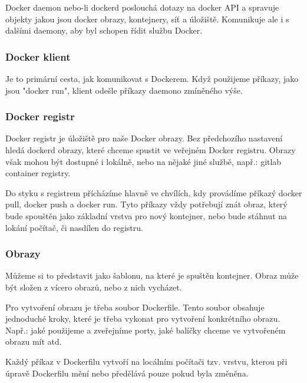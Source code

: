 Docker daemon nebo-li dockerd poslouchá dotazy na docker API a spravuje objekty jakou jsou docker obrazy, kontejnery, síť a úložiště. Komunikuje ale i s dalšími daemony, aby byl schopen řídit službu Docker.

\subsubsection{Docker klient}

Je to primární cesta, jak komunikovat s Dockerem. Když použijeme příkazy, jako jsou "docker run", klient odešle příkazy daemono zmíněného výše. 

\subsubsection{Docker registr}

Docker registr je úložiště pro naše Docker obrazy. Bez předchozího nastavení hledá dockerd obrazy, které chceme spustit ve veřejném Docker registru. Obrazy však mohou být dostupné i lokálně, nebo na nějaké jiné službě, např.: gitlab container registry. 

Do styku s registrem přícházíme hlavně ve chvílích, kdy provádíme příkazý docker pull, docker push a docker run. Tyto příkazy vždy potřebují znát obraz, který bude spouštěn jako základní vrstva pro nový kontejner, nebo bude stáhnut na lokání počítač, či nasdílen do registru.

\subsubsection{Obrazy}

Můžeme si to představit jako šablonu, na které je spuštěn kontejner. Obraz může být složen z vícero obrazů, nebo z nich vycházet. 

Pro vytvoření obrazu je třeba soubor Dockerfile. Tento soubor obsahuje jednoduché kroky, které je třeba vykonat pro vytvoření konkrétního obrazu. Např.: jaké použijeme a zveřejníme porty, jaké balíčky chceme ve vytvořeném obrazu mít atd. 

Každý příkaz v Dockerfilu vytvoří na locálním počítači tzv. vrstvu, kterou při úpravě Dockerfilu mění nebo předělává pouze pokud byla změněna. 

